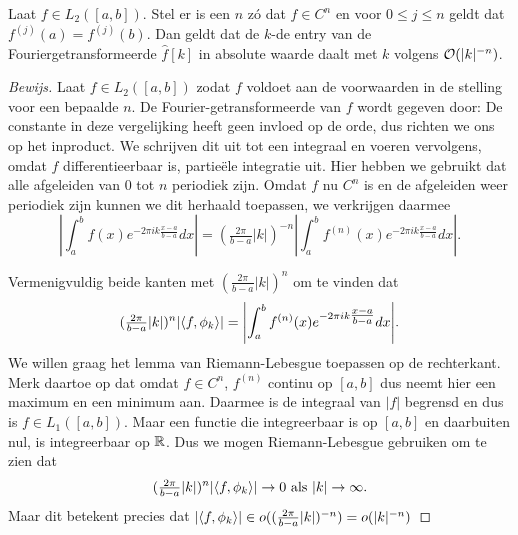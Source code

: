 \begin{stelling}
\label{fourier_daling}
  Laat $f \in L_2([a,b])$. Stel er is een $n$ z\'o dat $f \in C^n$ en voor $0\leq j\leq n$ geldt dat $f^{(j)}(a) = f^{(j)}(b)$. Dan geldt dat de $k$-de entry van de Fouriergetransformeerde $\hat f[k]$ in absolute waarde
  daalt met $k$ volgens $\mathcal{O}(|k|^{-n})$.
\end{stelling}
\begin{proof}[Bewijs]
  Laat $f \in L_2([a,b])$ zodat $f$ voldoet aan de voorwaarden in de stelling voor een bepaalde $n$. 
  De Fourier-getransformeerde van $f$ wordt gegeven door:
  De constante in deze vergelijking heeft geen invloed op de orde, dus richten we ons op het inproduct. 
  We schrijven dit uit tot een integraal en voeren vervolgens, omdat $f$ differentieerbaar is, partie\"ele
  integratie uit.
  Hier hebben we gebruikt dat alle afgeleiden van $0$ tot $n$ periodiek zijn.
  Omdat $f$ nu $C^n$ is en de afgeleiden weer periodiek zijn kunnen we dit herhaald toepassen,
  we verkrijgen daarmee
  \[
  \left| \int_a^b f(x) e^{-2 \pi i k \tfrac{x-a}{b-a}} dx \right| 
  = (\tfrac{2 \pi}{b-a} |k|)^{-n}\left| \int_a^b f^{(n)}(x) e^{- 2 \pi i k \tfrac{x-a}{b-a}} dx \right|.
  \]
  
  Vermenigvuldig beide kanten met $(\tfrac{2 \pi}{b-a} |k|)^n$ om te vinden dat
  \[
  (\tfrac{2 \pi}{b-a} |k|)^n {\left| \langle f , \phi_k \rangle \right|} 
  = {\left| \int_a^b f^{(n)}(x) e^{- 2 \pi i k \tfrac{x-a}{b-a}} dx \right|}.
  \]
  We willen graag het lemma van Riemann-Lebesgue toepassen op de rechterkant. 
  Merk daartoe op dat omdat $f \in C^n$, $f^{(n)}$ continu op $[a,b]$ 
  dus neemt hier een maximum en een minimum aan. 
  Daarmee is de integraal van $|f|$ begrensd en dus is $f\in L_1([a,b])$. 
  Maar een functie die integreerbaar is op $[a,b]$ en daarbuiten nul, is integreerbaar op $\mathbb{R}$. 
  Dus we mogen Riemann-Lebesgue gebruiken om te zien dat
  \[
  (\tfrac{2 \pi}{b-a} |k|)^n {\left| \langle f , \phi_k \rangle \right|} \to 0 \text{ als } |k| \to \infty.
  \]
  Maar dit betekent precies dat ${\left| \langle f , \phi_k \rangle \right|} \in  o((\tfrac{2 \pi}{b-a} |k|)^{-n}) = o(|k|^{-n})$
\end{proof}

